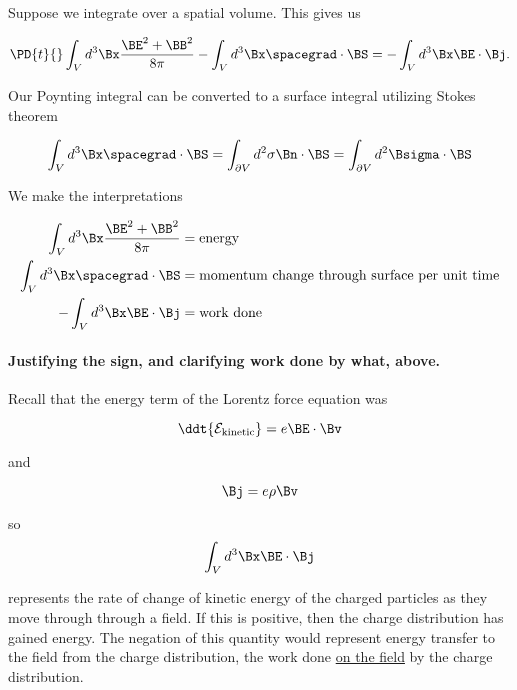 Suppose we integrate over a spatial volume.  This gives us

\begin{equation}\label{eqn:relativisticElectrodynamicsL16:670b}
\PD{t}{}\int_V d^3 \Bx \frac{ \BE^2 + \BB^2 }{8 \pi} - \int_V d^3 \Bx \spacegrad \cdot \BS = - \int_V d^3 \Bx \BE \cdot \Bj.
\end{equation}

Our Poynting integral can be converted to a surface integral utilizing Stokes theorem

\begin{equation}\label{eqn:relativisticElectrodynamicsL16:800}
\int_V d^3 \Bx \spacegrad \cdot \BS = \int_{\partial V} d^2 \sigma \Bn \cdot \BS =
\int_{\partial V} d^2 \Bsigma \cdot \BS
\end{equation}

We make the interpretations

\begin{align*}
\int_V d^3 \Bx \frac{ \BE^2 + \BB^2 }{8 \pi} &= \mbox{energy} \\
\int_V d^3 \Bx \spacegrad \cdot \BS &= \mbox{momentum change through surface per unit time} \\
- \int_V d^3 \Bx \BE \cdot \Bj &= \mbox{work done}
\end{align*}

\paragraph{Justifying the sign, and clarifying work done by what, above.}

Recall that the energy term of the Lorentz force equation was

\begin{equation}\label{eqn:relativisticElectrodynamicsL16:820}
\ddt{\mathcal{E}_{\text{kinetic}}} = e \BE \cdot \Bv
\end{equation}

and

\begin{equation}\label{eqn:relativisticElectrodynamicsL16:840}
\Bj = e \rho \Bv
\end{equation}

so
\begin{equation}\label{eqn:relativisticElectrodynamicsL16:860}
\int_V d^3 \Bx \BE \cdot \Bj
\end{equation}

represents the rate of change of kinetic energy of the charged particles as they move through through a field.  If this is positive, then the charge distribution has gained energy.  The negation of this quantity would represent energy transfer to the field from the charge distribution, the work done \underline{on the field} by the charge distribution.

